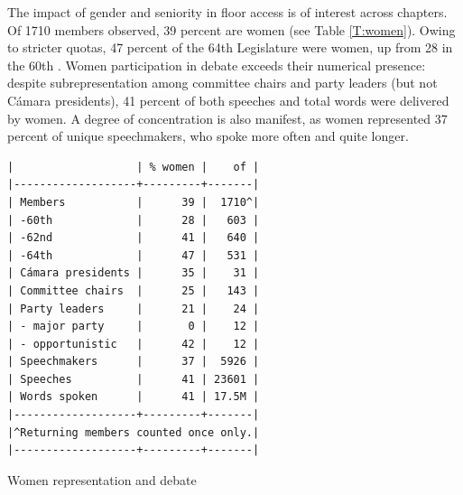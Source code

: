 \documentclass[letter,12pt]{article}
\begin{document}



The impact of gender and seniority in floor access is of interest across chapters. Of 1710 members observed, 39 percent are women (see Table \ref{T:women}). Owing to stricter quotas, 47 percent of the 64th Legislature were women, up from 28 in the 60th \citep{piscopo.2016}. Women participation in debate exceeds their numerical presence: despite subrepresentation among committee chairs and party leaders (but not Cámara presidents), 41 percent of both speeches and total words were delivered by women. A degree of concentration is also manifest, as women represented 37 percent of unique speechmakers, who spoke more often and quite longer. 

\begin{table}
  \begin{scriptsize}
    \begin{verbatim}
|                   | % women |    of |
|-------------------+---------+-------|
| Members           |      39 |  1710^|
| -60th             |      28 |   603 |
| -62nd             |      41 |   640 |
| -64th             |      47 |   531 |
| Cámara presidents |      35 |    31 |
| Committee chairs  |      25 |   143 |
| Party leaders     |      21 |    24 |
| - major party     |       0 |    12 |
| - opportunistic   |      42 |    12 |
| Speechmakers      |      37 |  5926 |
| Speeches          |      41 | 23601 |
| Words spoken      |      41 | 17.5M |
|-------------------+---------+-------|
|^Returning members counted once only.|
|-------------------+---------+-------|
    \end{verbatim}
  \end{scriptsize}
\caption{Women representation and debate}\label{T:women}
\end{table}
\end{document}

